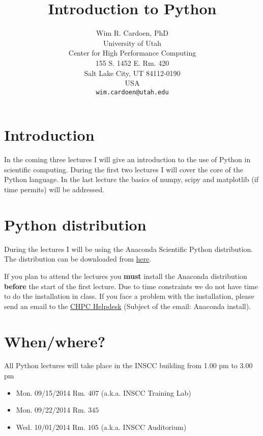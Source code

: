 \documentclass[11pt]{article}
\begin{document}
\thispagestyle{empty}
\title{Introduction to Python}
\author{Wim R. Cardoen, PhD \\
        University of Utah\\
        Center for High Performance Computing \\ 
        155 S. 1452 E. Rm. 420\\ 
        Salt Lake City, UT 84112-0190 \\
        USA\\
        \texttt{wim.cardoen@utah.edu}}
\renewcommand{\labelitemii}{$\star$}
\maketitle\thispagestyle{empty}
\pagebreak
\pagestyle{plain}
\setcounter{page}{1}
\section*{Introduction}
In the coming three lectures I will give an introduction to the use of Python in scientific computing. 
During the first two lectures I will cover the core of the Python language.
In the last lecture the basics of numpy, scipy and matplotlib (if time permits) will be addressed.

\renewcommand \thesection{\Roman{section}}
\section{Python distribution}
During the lectures I will be using the Anaconda Scientific Python distribution.
The distribution can be downloaded from \href{https://store.continuum.io/cshop/anaconda/}{here}.

If you plan to attend the lectures you \textbf{must} install the Anaconda distribution 
\textbf{before} the start of the first lecture. Due to time constraints we do not have time to 
do the installation in class.
If you face a problem with the installation, please send an email to the 
\href{mailto:issues@chpc.utah.edu}{CHPC Helpdesk} (Subject of the email: Anaconda install).

\section{When/where?}
All Python lectures will take place in the INSCC building from 1.00 pm to 3.00 pm
\begin{itemize}
 \item Mon. 09/15/2014  Rm. $407$ (a.k.a. INSCC Training Lab)
 \item Mon. 09/22/2014  Rm. $345$
 \item Wed. 10/01/2014  Rm. $105$ (a.k.a. INSCC Auditorium)
\end{itemize}
\end{document}
